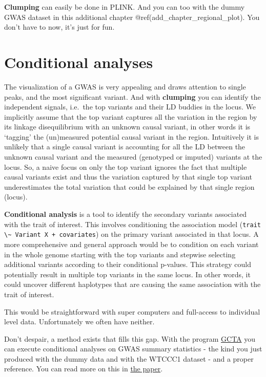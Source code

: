 \documentclass[
]{book}
\newcommand{\passthrough}[1]{#1}
\begin{document}
\textbf{Clumping} can easily be done in PLINK. And you can too with the dummy GWAS dataset in this additional chapter @ref(add\_chapter\_regional\_plot). You don't have to now, it's just for fun.

\hypertarget{conditional-analyses}{%
\section{Conditional analyses}\label{conditional-analyses}}

The visualization of a GWAS is very appealing and draws attention to single peaks, and the most significant variant. And with \textbf{clumping} you can identify the independent signals, i.e.~the top variants and their LD buddies in the locus. We implicitly assume that the top variant captures all the variation in the region by its linkage disequilibrium with an unknown causal variant, in other words it is `tagging' the (un)measured potential causal variant in the region. Intuitively it is unlikely that a single causal variant is accounting for all the LD between the unknown causal variant and the measured (genotyped or imputed) variants at the locus. So, a naive focus on only the top variant ignores the fact that multiple causal variants exist and thus the variation captured by that single top variant underestimates the total variation that could be explained by that single region (locus).

\textbf{Conditional analysis} is a tool to identify the secondary variants associated with the trait of interest. This involves conditioning the association model (\passthrough{\lstinline!trait \~ Variant X + covariates!}) on the primary variant associated in that locus. A more comprehensive and general approach would be to condition on each variant in the whole genome starting with the top variants and stepwise selecting additional variants according to their conditional p-values. This strategy could potentially result in multiple top variants in the same locus. In other words, it could uncover different haplotypes that are causing the same association with the trait of interest.

This would be straightforward with super computers and full-access to individual level data. Unfortunately we often have neither.

Don't despair, a method exists that fills this gap. With the program \href{http://cnsgenomics.com/software/gcta/\#Overview}{GCTA} you can execute conditional analyses on GWAS summary statistics - the kind you just produced with the dummy data and with the WTCCC1 dataset - and a proper reference. You can read more on this in \href{https://www.nature.com/articles/ng.2213}{the paper}.
\end{document}
